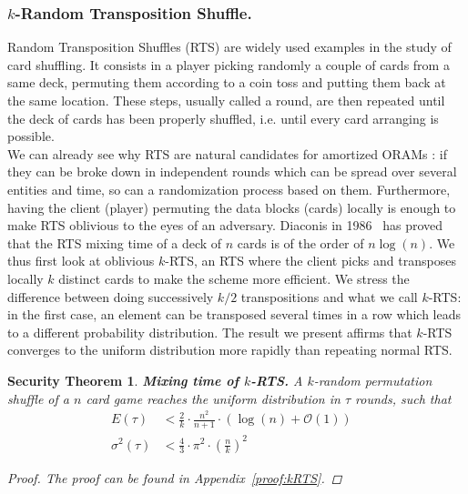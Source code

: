 \documentclass{llncs}
\newtheorem{secthm}{Security Theorem}
\begin{document}
\subsubsection{$k$-Random Transposition Shuffle.}\label{kRTS}
Random Transposition Shuffles (RTS) are widely used examples in the study of card shuffling. It consists in a player picking randomly a couple of cards from a same deck, permuting them according to a coin toss and putting them back at the same location.
These steps, usually called a round, are then repeated until the deck of cards has been properly shuffled, i.e. until every card arranging is possible.\\
We can already see why RTS are natural candidates for amortized ORAMs : if they can be broke down in independent rounds which can be spread over several entities and time, so can a randomization process based on them. Furthermore, having the client (player) permuting the data blocks (cards) locally is enough to make RTS oblivious to the eyes of an adversary.
Diaconis in 1986~\cite{aldous1986shuffling} has proved that the RTS mixing time of a deck of $n$ cards is of the order of $n\log(n)$. We thus first look at oblivious $k$-RTS, an RTS where the client picks and transposes locally $k$ distinct cards to make the scheme more efficient. We stress the difference between doing successively $k/2$ transpositions and what we call $k$-RTS: in the first case, an element can be transposed several times in a row which leads to a different probability distribution. The result we present affirms that  $k$-RTS converges to the uniform distribution more rapidly than repeating normal RTS.  

\begin{secthm}
\textbf{Mixing time of $k$-RTS.} A $k$-random permutation shuffle of a $n$ card game reaches the uniform distribution in $\tau$ rounds, such that
\begin{align*}
E(\tau) &< \frac{2}{k}\cdot\frac{n^2}{n+1}\cdot \left ( \log(n) + \mathcal{O}(1) \right ) &\\
\sigma^2(\tau) &< \frac{4}{3} \cdot {\pi}^2 \cdot \left ( \frac{n}{k} \right )^2 &
\end{align*}
\begin{proof}
The proof can be found in Appendix~\ref{proof:kRTS}.
\end{proof}
\end{secthm}
\end{document}

